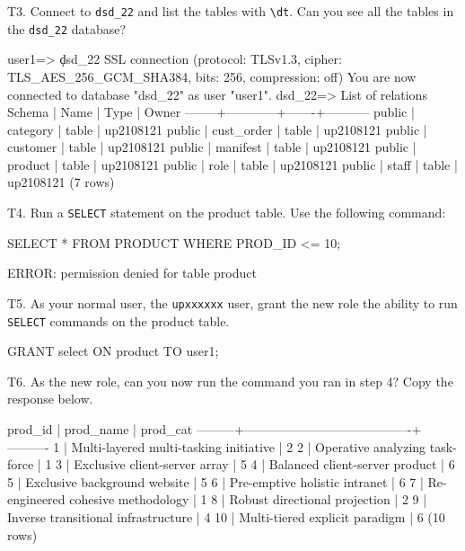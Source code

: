 T3. Connect to \verb|dsd_22| and list the tables with \verb|\dt|. Can you see all the tables in the \verb|dsd_22| database?
\begin{pseudo}
user1=> \c dsd_22
SSL connection (protocol: TLSv1.3, cipher: TLS_AES_256_GCM_SHA384, bits: 256, compression: off)
You are now connected to database "dsd_22" as user "user1".
dsd_22=> \dt
            List of relations
 Schema |    Name    | Type  |   Owner
--------+------------+-------+-----------
 public | category   | table | up2108121
 public | cust_order | table | up2108121
 public | customer   | table | up2108121
 public | manifest   | table | up2108121
 public | product    | table | up2108121
 public | role       | table | up2108121
 public | staff      | table | up2108121
(7 rows)
\end{pseudo}

T4. Run a \verb|SELECT| statement on the product table. Use the following command:
\begin{sql}
SELECT * FROM PRODUCT WHERE PROD_ID <= 10;
\end{sql}

\begin{pseudo}
ERROR:  permission denied for table product
\end{pseudo}

T5. As your normal user, the \verb|upxxxxxx| user, grant the new role the ability to run \verb|SELECT| commands on the product table.
\begin{sql}
GRANT select 
ON product
TO user1;
\end{sql}

T6. As the new role, can you now run the command you ran in step 4? Copy the response below.
\begin{pseudo}
 prod_id |               prod_name                | prod_cat
---------+----------------------------------------+----------
       1 | Multi-layered multi-tasking initiative |        2
       2 | Operative analyzing task-force         |        1
       3 | Exclusive client-server array          |        5
       4 | Balanced client-server product         |        6
       5 | Exclusive background website           |        5
       6 | Pre-emptive holistic intranet          |        6
       7 | Re-engineered cohesive methodology     |        1
       8 | Robust directional projection          |        2
       9 | Inverse transitional infrastructure    |        4
      10 | Multi-tiered explicit paradigm         |        6
(10 rows)
\end{pseudo}

